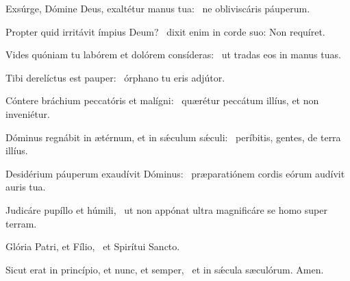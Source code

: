 \item Exsúrge, Dómine Deus, exaltétur manus tua:~\psstar{}  ne obliviscáris páuperum.
\item Propter quid irritávit ímpius Deum?~\psstar{} dixit enim in corde suo: Non requíret.
\item Vides quóniam tu labórem et dolórem consíderas:~\psstar{} ut tradas eos in manus tuas.
\item Tibi derelíctus est pauper:~\psstar{} órphano tu eris adjútor.
\item Cóntere bráchium peccatóris et malígni:~\psstar{} quærétur peccátum illíus, et non inveniétur.
\item Dóminus regnábit in ætérnum, et in sǽculum sǽculi:~\psstar{} períbitis, gentes, de terra illíus.
\item Desidérium páuperum exaudívit Dóminus:~\psstar{} præparatiónem cordis eórum audívit auris tua.
\item Judicáre pupíllo et húmili,~\psstar{} ut non appónat ultra magnificáre se homo super terram.
\item Glória Patri, et Fílio,~\psstar{} et Spirítui Sancto.
\item Sicut erat in princípio, et nunc, et semper,~\psstar{} et in sǽcula sæculórum. Amen.
